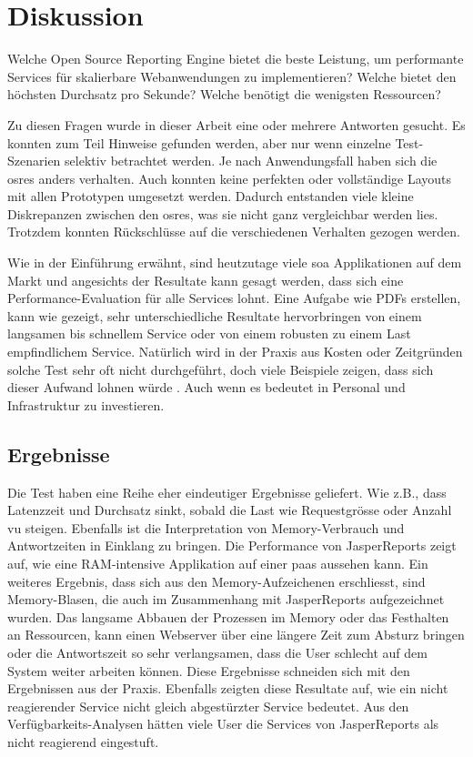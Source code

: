 \documentclass[main.tex]{subfiles}
\begin{document}
\chapter{Diskussion} 

Welche Open Source Reporting Engine bietet die beste Leistung, um performante Services für skalierbare Webanwendungen zu implementieren?
Welche bietet den höchsten Durchsatz pro Sekunde?
Welche benötigt die wenigsten Ressourcen?

Zu diesen Fragen wurde in dieser Arbeit eine oder mehrere Antworten gesucht. Es konnten zum Teil Hinweise gefunden werden, aber nur wenn einzelne Test-Szenarien selektiv betrachtet werden. Je nach Anwendungsfall haben sich die \acrshort{osre}s anders verhalten. Auch konnten keine perfekten oder vollständige Layouts mit allen Prototypen umgesetzt werden. Dadurch entstanden viele kleine Diskrepanzen zwischen den \acrshort{osre}s, was sie nicht ganz vergleichbar werden lies. Trotzdem konnten Rückschlüsse auf die verschiedenen Verhalten gezogen werden.  

Wie in der Einführung erwähnt, sind heutzutage viele \acrfull{soa} Applikationen auf dem Markt und angesichts der Resultate kann gesagt werden, dass sich eine Performance-Evaluation für alle Services lohnt. Eine Aufgabe wie PDFs erstellen, kann wie gezeigt, sehr unterschiedliche Resultate hervorbringen von einem langsamen bis schnellem Service oder von einem robusten zu einem Last empfindlichem Service. Natürlich wird in der Praxis aus Kosten oder Zeitgründen solche Test sehr oft nicht durchgeführt, doch viele Beispiele zeigen, dass sich dieser Aufwand lohnen würde \cite[vgl.~Kap.1]{erinle_2013}. Auch wenn es bedeutet in Personal und Infrastruktur zu investieren.   
\section{Ergebnisse}
Die Test haben eine Reihe eher eindeutiger Ergebnisse geliefert. Wie z.B., dass Latenzzeit und Durchsatz sinkt, sobald die Last wie Requestgrösse oder Anzahl \acrlong{vu} steigen. Ebenfalls ist die Interpretation von Memory-Verbrauch und Antwortzeiten in Einklang zu bringen. Die Performance von JasperReports zeigt auf, wie eine RAM-intensive Applikation auf einer \acrlong{paas} aussehen kann. Ein weiteres Ergebnis, dass sich aus den Memory-Aufzeichenen erschliesst, sind Memory-Blasen, die auch im Zusammenhang mit JasperReports aufgezeichnet wurden. Das langsame Abbauen der Prozessen im Memory oder das Festhalten an Ressourcen, kann einen Webserver über eine längere Zeit zum Absturz bringen oder die Antwortszeit so sehr verlangsamen, dass die User schlecht auf dem System weiter arbeiten können. Diese Ergebnisse schneiden sich mit den Ergebnissen aus der Praxis. Ebenfalls zeigten diese Resultate auf, wie ein nicht reagierender Service nicht gleich abgestürzter Service bedeutet. Aus den Verfügbarkeits-Analysen hätten viele User die Services von JasperReports als nicht reagierend eingestuft. 
\end{document}

